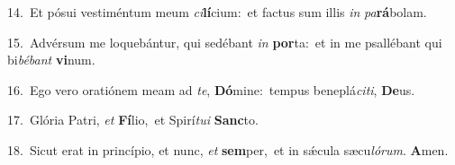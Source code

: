 {\numbfont\textcolor{\numbcolor}{14.}}~Et pósui vestiméntum meum \textit{ci}\-\textbf{lí}cium:~\star et factus sum illis \textit{in} \textit{pa}\-\textbf{rá}bolam.\par
{\numbfont\textcolor{\numbcolor}{15.}}~Advérsum me loquebántur, qui sedébant \textit{in} \textbf{por}\-ta:~\star et in me psallébant qui bi\-\textit{bé}\-\textit{bant} \textbf{vi}\-num.\par
{\numbfont\textcolor{\numbcolor}{16.}}~Ego vero oratiónem meam ad \textit{te}\-, \textbf{Dó}\-mine:~\star tempus beneplá\-\textit{ci}\-\textit{ti}, \textbf{De}\-us.\par
{\numbfont\textcolor{\numbcolor}{17.}}~Glória Patri, \textit{et} \textbf{Fí}\-lio,~\star et Spirí\-\textit{tu}\-\textit{i} \textbf{Sanc}\-to.\par
{\numbfont\textcolor{\numbcolor}{18.}}~Sicut erat in princípio, et nunc, \textit{et} \textbf{sem}\-per,~\star et in sǽcula sæcu\-\textit{ló}\-\textit{rum}. \textbf{A}\-men.\par
